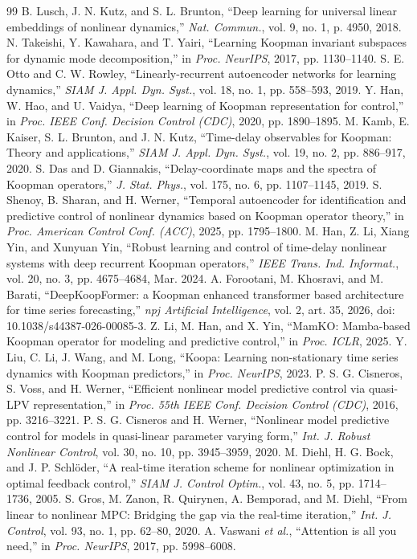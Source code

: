 \documentclass[journal]{IEEEtran}
\theoremstyle{plain}
\theoremstyle{definition}
\begin{document}
\begin{thebibliography}{99}
B. Lusch, J. N. Kutz, and S. L. Brunton, ``Deep learning for universal linear embeddings of nonlinear dynamics,'' \emph{Nat. Commun.}, vol. 9, no. 1, p. 4950, 2018.
N. Takeishi, Y. Kawahara, and T. Yairi, ``Learning Koopman invariant subspaces for dynamic mode decomposition,'' in \emph{Proc. NeurIPS}, 2017, pp. 1130--1140.
S. E. Otto and C. W. Rowley, ``Linearly-recurrent autoencoder networks for learning dynamics,'' \emph{SIAM J. Appl. Dyn. Syst.}, vol. 18, no. 1, pp. 558--593, 2019.
Y. Han, W. Hao, and U. Vaidya, ``Deep learning of Koopman representation for control,'' in \emph{Proc. IEEE Conf. Decision Control (CDC)}, 2020, pp. 1890--1895.
M. Kamb, E. Kaiser, S. L. Brunton, and J. N. Kutz, ``Time-delay observables for Koopman: Theory and applications,'' \emph{SIAM J. Appl. Dyn. Syst.}, vol. 19, no. 2, pp. 886--917, 2020.
S. Das and D. Giannakis, ``Delay-coordinate maps and the spectra of Koopman operators,'' \emph{J. Stat. Phys.}, vol. 175, no. 6, pp. 1107--1145, 2019.
S. Shenoy, B. Sharan, and H. Werner, ``Temporal autoencoder for identification and predictive control of nonlinear dynamics based on Koopman operator theory,'' in \emph{Proc. American Control Conf. (ACC)}, 2025, pp. 1795--1800.
M. Han, Z. Li, Xiang Yin, and Xunyuan Yin, ``Robust learning and control of time-delay nonlinear systems with deep recurrent Koopman operators,'' \emph{IEEE Trans. Ind. Informat.}, vol. 20, no. 3, pp. 4675--4684, Mar. 2024.
A. Forootani, M. Khosravi, and M. Barati, ``DeepKoopFormer: a Koopman enhanced transformer based architecture for time series forecasting,'' \emph{npj Artificial Intelligence}, vol. 2, art. 35, 2026, doi: 10.1038/s44387-026-00085-3.
Z. Li, M. Han, and X. Yin, ``MamKO: Mamba-based Koopman operator for modeling and predictive control,'' in \emph{Proc. ICLR}, 2025.
Y. Liu, C. Li, J. Wang, and M. Long, ``Koopa: Learning non-stationary time series dynamics with Koopman predictors,'' in \emph{Proc. NeurIPS}, 2023.
P. S. G. Cisneros, S. Voss, and H. Werner, ``Efficient nonlinear model predictive control via quasi-LPV representation,'' in \emph{Proc. 55th IEEE Conf. Decision Control (CDC)}, 2016, pp. 3216--3221.
P. S. G. Cisneros and H. Werner, ``Nonlinear model predictive control for models in quasi-linear parameter varying form,'' \emph{Int. J. Robust Nonlinear Control}, vol. 30, no. 10, pp. 3945--3959, 2020.
M. Diehl, H. G. Bock, and J. P. Schl\"oder, ``A real-time iteration scheme for nonlinear optimization in optimal feedback control,'' \emph{SIAM J. Control Optim.}, vol. 43, no. 5, pp. 1714--1736, 2005.
S. Gros, M. Zanon, R. Quirynen, A. Bemporad, and M. Diehl, ``From linear to nonlinear MPC: Bridging the gap via the real-time iteration,'' \emph{Int. J. Control}, vol. 93, no. 1, pp. 62--80, 2020.
A. Vaswani \emph{et al.}, ``Attention is all you need,'' in \emph{Proc. NeurIPS}, 2017, pp. 5998--6008.
\end{thebibliography}
\end{document}
